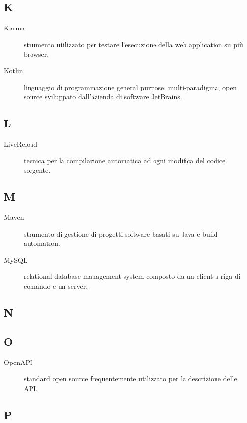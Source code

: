 \documentclass[../../../manuale.sviluppatore.tex]{subfiles}
\begin{document}
\subsection{K}

\begin{description}
    \item[Karma] strumento utilizzato per testare l'esecuzione della web application su più browser.
    \item[Kotlin] linguaggio di programmazione general purpose, multi-paradigma, open source sviluppato dall'azienda di software JetBrains.
\end{description}

\subsection{L}

\begin{description}
    \item[LiveReload] tecnica per la compilazione automatica ad ogni modifica del codice sorgente.
\end{description}

\subsection{M}

\begin{description}
    \item[Maven]  strumento di gestione di progetti software basati su Java e build automation.
    \item[MySQL] relational database management system composto da un client a riga di comando e un server.
\end{description}

\subsection{N}

\subsection{O}

\begin{description}
    \item[OpenAPI] standard open source frequentemente utilizzato per la descrizione delle API\@.
\end{description}

\subsection{P}
\end{document}
